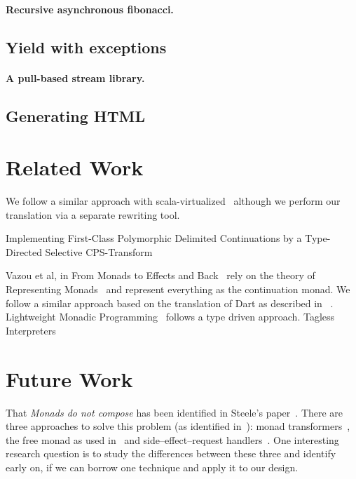 \documentclass{sigplanconf}
\begin{document}
\paragraph{Recursive asynchronous fibonacci. }

\subsection{Yield with exceptions}

\paragraph{A pull-based stream library. }

\subsection{Generating HTML}


\section{Related Work}

We follow a similar approach with scala-virtualized~\cite{moors_scalavirtualized_2012} although we perform our translation via a separate rewriting tool.

Implementing First-Class Polymorphic Delimited Continuations by a Type-Directed Selective CPS-Transform~\cite{rompf_shift_2009}

Vazou et al, in From Monads to Effects and 
Back~\cite{vazou_koka_2016} rely on the theory of Representing 
Monads~\cite{filinski_representing_1994} and represent everything
as the continuation monad. We follow a similar approach based on the 
translation of Dart as described in ~\cite{meijer_dar_2015}. Lightweight Monadic Programming~\cite{swamy_lightweight_2011} follows a type driven approach. Tagless Interpreters~\cite{carette_finally_2007}

\section{Future Work}

That \emph{Monads do not compose} has been identified in Steele's
paper~\cite{steele_building_1994}. There are three approaches to solve
this problem (as identified in~\cite{kiselyov_freer_2015}): monad
transformers~\cite{liang_monad_1995}, the free monad as used
in~\cite{swierstra_data_2008} and side--effect--request
handlers~\cite{cartwright_extensible_1994}. One interesting research
question is to study the differences between these three and identify
early on, if we can borrow one technique and apply it to our
design. 




\end{document}
